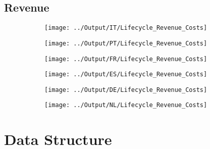 \documentclass[12pt,notitlepage]{article}
\begin{document}


\subsection{Revenue} %
\label{sec:revenue}



\begin{figure}[!htpb]
\centering
\caption{Average Revenue and Costs by Year}
\begin{subfigure}{.49\textwidth}
    \centering
 \texttt{[image: ../Output/IT/Lifecycle\_Revenue\_Costs]}
\end{subfigure}%
\begin{subfigure}{.49\textwidth}
    \centering
 \texttt{[image: ../Output/PT/Lifecycle\_Revenue\_Costs]}
\end{subfigure}
\begin{subfigure}{.49\textwidth}
    \centering
 \texttt{[image: ../Output/FR/Lifecycle\_Revenue\_Costs]}
\end{subfigure}%
\begin{subfigure}{.49\textwidth}
    \centering
 \texttt{[image: ../Output/ES/Lifecycle\_Revenue\_Costs]}
\end{subfigure}
\begin{subfigure}{.49\textwidth}
    \centering
 \texttt{[image: ../Output/DE/Lifecycle\_Revenue\_Costs]}
\end{subfigure}
\begin{subfigure}{.49\textwidth}
    \centering
 \texttt{[image: ../Output/NL/Lifecycle\_Revenue\_Costs]}
\end{subfigure}
\end{figure}
\pagebreak








\FloatBarrier
\section{Data Structure} %
\label{sec:data_structure}
\FloatBarrier
\end{document}

